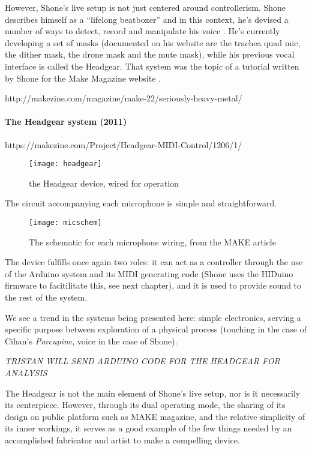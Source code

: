 However, Shone's live setup is not just centered around controllerism. Shone describes himself as a ``lifelong beatboxer'' and in this context, he's devised a number of ways to detect, record and manipulate his voice \citep{shone2012}. He's currently developing a set of masks (documented on his website are the trachea quad mic, the dither mask, the drone mask and the mute mask), while his previous vocal interface is called the Headgear. That system was the topic of a tutorial written by Shone for the Make Magazine website \citep{shone2012}. 

http://makezine.com/magazine/make-22/seriously-heavy-metal/

\paragraph{The Headgear system (2011)}

https://makezine.com/Project/Headgear-MIDI-Control/1206/1/

	\begin{figure}[h!]
	  \caption{the Headgear device, wired for operation}
	  \centering
	    \texttt{[image: headgear]}
	\end{figure}
	
The circuit accompanying each microphone is simple and straightforward.  

		\begin{figure}[h!]
		  \caption{The schematic for each microphone wiring, from the MAKE article}
		  \centering
		    \texttt{[image: micschem]}
		\end{figure}
		
		The device fulfills once again two roles: it can act as a controller through the use of the Arduino system and its MIDI generating code (Shone uses the HIDuino firmware to facitilitate this, see next chapter), and it is used to provide sound to the rest of the system. 
	
	We see a trend in the systems being presented here: simple electronics, serving a specific purpose between exploration of a physical process (touching in the case of Cihan's \emph{Porcupine}, voice in the case of Shone).

	\emph{TRISTAN WILL SEND ARDUINO CODE FOR THE HEADGEAR FOR ANALYSIS}
	
The Headgear is not the main element of Shone's live setup, nor is it necessarily its centerpiece. However, through its dual operating mode, the sharing of its design on public platform such as MAKE magazine, and the relative simplicity of its inner workings, it serves as a good example of the few things needed by an accomplished fabricator and artist to make a compelling device. 

